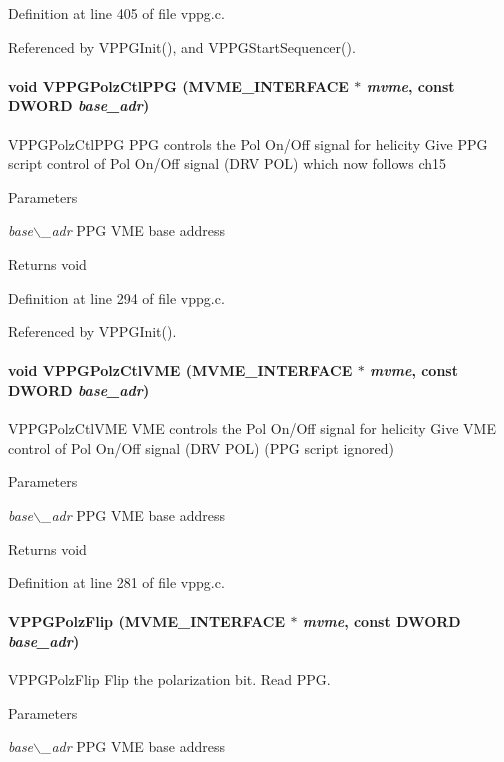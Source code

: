 Definition at line 405 of file vppg.c.

Referenced by VPPGInit(), and VPPGStartSequencer().
\paragraph[{VPPGPolzCtlPPG}]{\setlength{\rightskip}{0pt plus 5cm}void VPPGPolzCtlPPG ({\bf MVME\_\-INTERFACE} $\ast$ {\em mvme}, \/  const {\bf DWORD} {\em base\_\-adr})}\hfill\label{vppg_8c_a28d2b68c7c0e8d305cc8dd37edfd7dec}
VPPGPolzCtlPPG PPG controls the Pol On/Off signal for helicity  Give PPG script control of Pol On/Off signal (DRV POL) which now follows ch15 
\begin{DoxyParams}{Parameters}
\item[{\em base$\backslash$\_\-adr}]PPG VME base address \end{DoxyParams}
\begin{DoxyReturn}{Returns}
void 
\end{DoxyReturn}


Definition at line 294 of file vppg.c.

Referenced by VPPGInit().
\paragraph[{VPPGPolzCtlVME}]{\setlength{\rightskip}{0pt plus 5cm}void VPPGPolzCtlVME ({\bf MVME\_\-INTERFACE} $\ast$ {\em mvme}, \/  const {\bf DWORD} {\em base\_\-adr})}\hfill\label{vppg_8c_a070407a7d64392ec20ad840d44ffb01c}
VPPGPolzCtlVME VME controls the Pol On/Off signal for helicity  Give VME control of Pol On/Off signal (DRV POL) (PPG script ignored) 
\begin{DoxyParams}{Parameters}
\item[{\em base$\backslash$\_\-adr}]PPG VME base address \end{DoxyParams}
\begin{DoxyReturn}{Returns}
void 
\end{DoxyReturn}


Definition at line 281 of file vppg.c.
\paragraph[{VPPGPolzFlip}]{ VPPGPolzFlip ({\bf MVME\_\-INTERFACE} $\ast$ {\em mvme}, \/  const {\bf DWORD} {\em base\_\-adr})}\hfill\label{vppg_8c_ae7f3d0874c56189b93a9abde9c337714}
VPPGPolzFlip Flip the polarization bit.  Read PPG. 
\begin{DoxyParams}{Parameters}
\item[{\em base$\backslash$\_\-adr}]PPG VME base address \end{DoxyParams}



